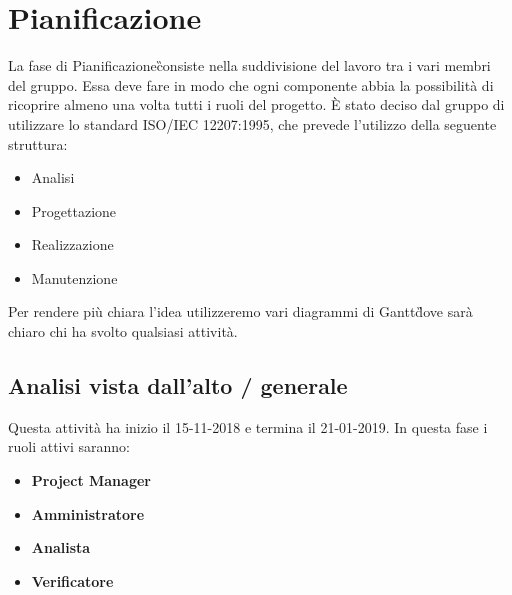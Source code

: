 \newpage
\section{Pianificazione}\label{Pianificazione}
    La fase di Pianificazione\G consiste nella suddivisione del lavoro tra i vari membri del gruppo. Essa deve fare in modo che ogni componente abbia la possibilità di ricoprire almeno una volta tutti i ruoli del progetto.
    È stato deciso dal gruppo di utilizzare lo standard ISO/IEC 12207:1995\GAlt, che prevede l'utilizzo della seguente struttura:
    \begin{itemize}
        \item Analisi
        \item Progettazione
        \item Realizzazione
        \item Manutenzione
    \end{itemize}

    Per rendere più chiara l'idea utilizzeremo vari diagrammi di Gantt\G dove sarà chiaro chi ha svolto qualsiasi attività.	

    \subsection{Analisi vista dall'alto / generale}
        Questa attività ha inizio il 15-11-2018 e termina il 21-01-2019. In questa fase i ruoli attivi saranno: 
        \begin{itemize}
            \item \textbf{Project Manager}
            \item \textbf{Amministratore}
            \item \textbf{Analista}
            \item \textbf{Verificatore}
        \end{itemize}

